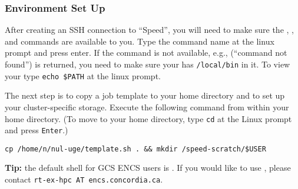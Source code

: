 \subsubsection{Environment Set Up}
\label{sect:envsetup}

After creating an SSH connection to ``Speed'', you will need to
make sure the , , and 
commands are available to you. 
Type the command name at the linux prompt and press enter.
If the command is not available, e.g.,  (``command not found'') is returned,
you need to make sure your  has \texttt{/local/bin} in it.
To view your  type \texttt{echo \$PATH} at the linux prompt.
%
%
%
%
%
%

The next step is to copy a job template to your home directory and to set up your
cluster-specific storage. Execute the following command from within your
home directory. (To move to your home directory, type \texttt{cd} at the Linux
prompt and press \texttt{Enter}.) 

\begin{verbatim}
cp /home/n/nul-uge/template.sh . && mkdir /speed-scratch/$USER
\end{verbatim}


\textbf{Tip:} the default shell for GCS ENCS users is .
If you would like to use , please contact 
\texttt{rt-ex-hpc AT encs.concordia.ca}.

